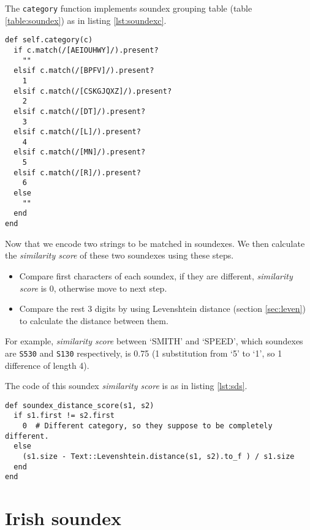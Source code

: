 The \texttt{category} function implements soundex grouping table (table \ref{table:soundex})
as in listing \ref{lst:soundexc}.

\begin{minipage}{\linewidth}
\begin{lstlisting}[label={lst:soundexc}, caption={Soundex grouping table implementation.}]
def self.category(c)
  if c.match(/[AEIOUHWY]/).present?
    ""
  elsif c.match(/[BPFV]/).present?
    1
  elsif c.match(/[CSKGJQXZ]/).present?
    2
  elsif c.match(/[DT]/).present?
    3
  elsif c.match(/[L]/).present?
    4
  elsif c.match(/[MN]/).present?
    5
  elsif c.match(/[R]/).present?
    6
  else
    ""
  end
end
\end{lstlisting}
\end{minipage}

Now that we encode two strings to be matched in soundexes.
We then calculate the \emph{similarity score} of these two soundexes using
these steps.

\begin{itemize}
  \item Compare first characters of each soundex, if they are different,
    \emph{similarity score} is 0, otherwise move to next step.
  \item Compare the rest 3 digits by using Levenshtein distance (section \ref{sec:leven})
    to calculate the distance between them.
\end{itemize}

For example, \emph{similarity score} between `SMITH' and `SPEED',
which soundexes are \texttt{S530} and \texttt{S130} respectively,
is 0.75 (1 substitution from `5' to `1', so 1 difference of length 4).

The code of this soundex \emph{similarity score} is as in listing \ref{lst:sds}.

\begin{minipage}{\linewidth}
  \begin{lstlisting}[label={lst:sds}, caption={Soundex similarity score implementation.}]
def soundex_distance_score(s1, s2)
  if s1.first != s2.first
    0  # Different category, so they suppose to be completely different.
  else
    (s1.size - Text::Levenshtein.distance(s1, s2).to_f ) / s1.size
  end
end
\end{lstlisting}
\end{minipage}

\section{Irish soundex}

